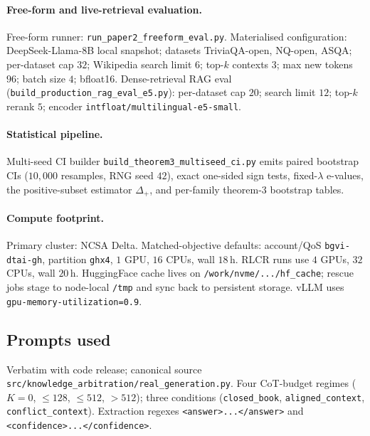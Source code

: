 \paragraph{Free-form and live-retrieval evaluation.}
Free-form runner: \texttt{run\_paper2\_freeform\_eval.py}.  Materialised
configuration: DeepSeek-Llama-8B local snapshot; datasets
TriviaQA-open, NQ-open, ASQA; per-dataset cap $32$; Wikipedia search
limit $6$; top-$k$ contexts $3$; max new tokens $96$; batch size $4$;
bfloat16.  Dense-retrieval RAG eval
(\texttt{build\_production\_rag\_eval\_e5.py}): per-dataset cap $20$;
search limit $12$; top-$k$ rerank $5$; encoder
\texttt{intfloat/multilingual-e5-small}.

\paragraph{Statistical pipeline.}
Multi-seed CI builder \texttt{build\_theorem3\_multiseed\_ci.py}
emits paired bootstrap CIs ($10{,}000$ resamples, RNG seed $42$),
exact one-sided sign tests, fixed-$\lambda$ e-values, the
positive-subset estimator $\widehat\Delta_+$, and per-family
theorem-3 bootstrap tables.

\paragraph{Compute footprint.}
Primary cluster: NCSA Delta.  Matched-objective defaults:
account/QoS \texttt{bgvi-dtai-gh}, partition \texttt{ghx4}, $1$ GPU,
$16$ CPUs, wall $18$\,h.  RLCR runs use $4$ GPUs, $32$ CPUs, wall
$20$\,h.  HuggingFace cache lives on \texttt{/work/nvme/.../hf\_cache};
rescue jobs stage to node-local \texttt{/tmp} and sync back to
persistent storage.  vLLM uses
\texttt{gpu-memory-utilization=0.9}.

\subsection{Prompts used}
\label{app:prompts}

Verbatim with code release; canonical source
\texttt{src/knowledge\_arbitration/real\_generation.py}.  Four
CoT-budget regimes ($K\!=\!0$, $\le\!128$, $\le\!512$, $>\!512$);
three conditions
(\texttt{closed\_book}, \texttt{aligned\_context}, \texttt{conflict\_context}).
Extraction regexes \texttt{<answer>...</answer>} and
\texttt{<confidence>...</confidence>}.

